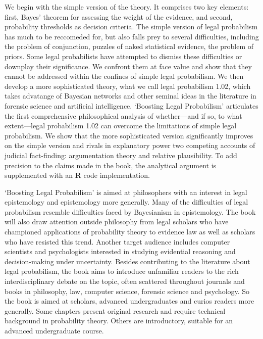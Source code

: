 \documentclass[10pt,dvipsnames,enabledeprecatedfontcommands]{scrartcl}
\begin{document}
We begin with the simple version of the theory. It comprises two key
elements: first, Bayes' theorem for assessing the weight of the
evidence, and second, probability thresholds as decision criteria. The
simple version of legal probabilism has much to be reccomeded for, but
also falls prey to several difficulties, including the problem of
conjunction, puzzles of naked statistical evidence, the problem of
priors. Some legal probabilists have attempted to dismiss these
difficulties or downplay their significance. We confront them at face
value and show that they cannot be addressed within the confines of
simple legal probabilism. We then develop a more sophisticated theory,
what we call legal probabilism 1.02, which takes advatange of Bayesian
networks and other seminal ideas in the literature in forensic science
and artificial intelligence. `Boosting Legal Probabilism' articulates
the first comprehensive philosophical analysis of whether---and if so,
to what extent---legal probabilism 1.02 can overcome the limitations of
simple legal probabilism. We show that the more sophisticated version
significantly improves on the simple version and rivals in explanatory
power two competing accounts of judicial fact-finding: argumentation
theory and relative plausibility. To add precision to the claims made in
the book, the analytical argument is supplemented with an
\textbf{\textsf{R}} code implementation.

`Boosting Legal Probabilism' is aimed at philosophers with an interest
in legal epistemology and epistemology more generally. Many of the
difficulties of legal probabilism resemble difficulties faced by
Bayesianism in epistemology. The book will also draw attention outside
philosophy from legal scholars who have championed applications of
probability theory to evidence law as well as scholars who have resisted
this trend. Another target audience includes computer scientists and
psychologists interested in studying evidential reasoning and
decision-making under uncertainty. Besides contributing to the
literature about legal probabilism, the book aims to introduce
unfamiliar readers to the rich interdisciplinary debate on the topic,
often scattered throughout journals and books in philosophy, law,
computer science, forensic science and psychology. So the book is aimed
at scholars, advanced undergraduates and curios readers more generally.
Some chapters present original research and require technical background
in probability theory. Others are introductory, suitable for an advanced
undergraduate course.
\end{document}
